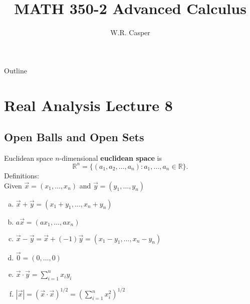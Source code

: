 \documentclass{beamer}
\title{MATH 350-2 Advanced Calculus}
\subtitle
{} %
\author[W.R. Casper] %
{W.R. Casper}
\institute[California State University Fullerton] %
{
  Department of Mathematics\\
  California State University Fullerton}
\begin{document}
\begin{frame}
  \titlepage
\end{frame}

\begin{frame}{Outline}
  \tableofcontents
\end{frame}



\section{Real Analysis Lecture 8}

\subsection{Open Balls and Open Sets}

\begin{frame}{Euclidean space}
\pause
$n$-dimensional \textbf{euclidean space} is
\pause
$$\mathbb{R}^n = \{(a_1,a_2,\dots,a_n): a_1,\dots, a_n\in\mathbb{R}\}.$$
\pause
Definitions:\\
\pause
Given $\vec x = (x_1,\dots, x_n)$ and $\vec y = (y_1,\dots, y_n)$
\begin{enumerate}[(a)]
\pause
\item $\vec x + \vec y = (x_1+y_1,\dots,x_n+y_n)$
\pause
\item $a\vec x = (ax_1,\dots, ax_n)$
\pause
\item $\vec x - \vec y = \vec x + (-1)\vec y = (x_1-y_1,\dots,x_n-y_n)$
\pause
\item $\vec 0 = (0,\dots, 0)$
\pause
\item $\vec x\cdot\vec y = \sum_{i=1}^n x_iy_i$
\pause
\item $|\vec x| = (\vec x\cdot\vec x)^{1/2} = \left(\sum_{i=1}^nx_i^2\right)^{1/2}$
\end{enumerate}
\end{frame}
\end{document}
